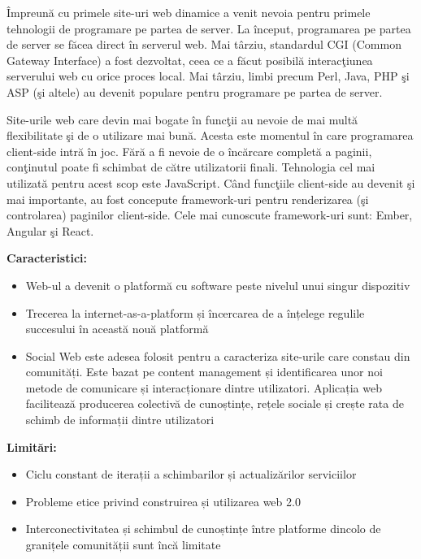 \documentclass[12pt, a4paper]{report}
\begin{document}
\^ Impreun\u a cu primele site-uri web dinamice a venit nevoia pentru primele tehnologii de programare pe partea de server. La \^ inceput, programarea pe partea de server se f\u acea direct \^ in serverul web. Mai t\^ arziu, standardul CGI (Common Gateway Interface) a fost dezvoltat, ceea ce a f\u acut posibil\u a interac\c tiunea serverului web cu orice proces local.
Mai t\^ arziu, limbi precum Perl, Java, PHP \c si ASP (\c si altele) au devenit populare pentru programare pe partea de server.

Site-urile web care devin mai bogate \^ in func\c tii au nevoie de mai mult\u a flexibilitate \c si de o utilizare mai bun\u a. Acesta este momentul \^ in care programarea client-side intr\u a \^ in joc. F\u ar\u a a fi nevoie de o \^ inc\u arcare complet\u a a paginii, con\c tinutul poate fi schimbat de c\u atre utilizatorii finali. Tehnologia cel mai utilizat\u a pentru acest scop este JavaScript.
C\^ and func\c tiile client-side au devenit \c si mai importante, au fost concepute framework-uri pentru renderizarea (\c si controlarea) paginilor client-side. Cele mai cunoscute framework-uri sunt: Ember, Angular \c si React.

\textbf{Caracteristici:}
\begin{itemize}
	\item Web-ul a devenit o platformă cu software peste nivelul unui singur dispozitiv
	\item Trecerea la internet-as-a-platform și încercarea de a înțelege regulile succesului în această nouă platformă
	\item Social Web este adesea folosit pentru a caracteriza site-urile care constau din comunități. Este bazat pe content management și identificarea unor noi metode de comunicare și interacționare dintre utilizatori. Aplicația web facilitează producerea colectivă de cunoștințe, rețele sociale și crește rata de schimb de informații dintre utilizatori
\end{itemize}


\textbf{Limitări:}
\begin{itemize}
	\item Ciclu constant de iterații a schimbarilor și actualizărilor serviciilor
	\item Probleme etice privind construirea și utilizarea web 2.0
	\item Interconectivitatea și schimbul de cunoștințe între platforme dincolo de granițele comunității sunt încă limitate
\end{itemize}
\end{document}
